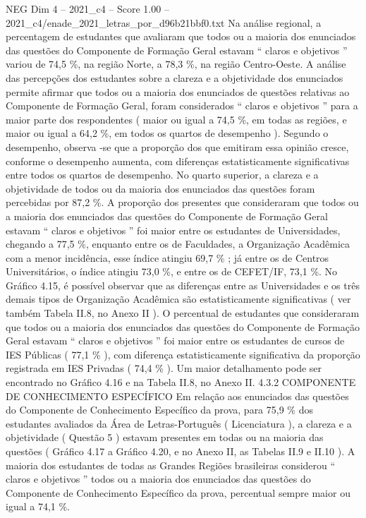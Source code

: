 \begin{textsample}{NEG Dim 4 – 2021\_c4 – Score 1.00 – 2021\_c4/enade\_2021\_letras\_por\_d96b21bbf0.txt}
Na análise regional, a percentagem de estudantes que avaliaram que todos ou a maioria dos enunciados das questões do Componente de Formação Geral estavam “ claros e objetivos ” variou de 74,5 \%, na região Norte, a 78,3 \%, na região Centro-Oeste.
A análise das percepções dos estudantes sobre a clareza e a objetividade dos enunciados permite afirmar que todos ou a maioria dos enunciados de questões relativas ao Componente de Formação Geral, foram considerados “ claros e objetivos ” para a maior parte dos respondentes ( maior ou igual a 74,5 \%, em todas as regiões, e maior ou igual a 64,2 \%, em todos os quartos de desempenho ).
Segundo o desempenho, observa -se que a proporção dos que emitiram essa opinião cresce, conforme o desempenho aumenta, com diferenças estatisticamente significativas entre todos os quartos de desempenho.
No quarto superior, a clareza e a objetividade de todos ou da maioria dos enunciados das questões foram percebidas por 87,2 \%.
A proporção dos presentes que consideraram que todos ou a maioria dos enunciados das questões do Componente de Formação Geral estavam “ claros e objetivos ” foi maior entre os estudantes de Universidades, chegando a 77,5 \%, enquanto entre os de Faculdades, a Organização Acadêmica com a menor incidência, esse índice atingiu 69,7 \% ; já entre os de Centros Universitários, o índice atingiu 73,0 \%, e entre os de CEFET/IF, 73,1 \%.
No Gráfico 4.15, é possível observar que as diferenças entre as Universidades e os três demais tipos de Organização Acadêmica são estatisticamente significativas ( ver também Tabela II.8, no Anexo II ).
O percentual de estudantes que consideraram que todos ou a maioria dos enunciados das questões do Componente de Formação Geral estavam “ claros e objetivos ” foi maior entre os estudantes de cursos de IES Públicas ( 77,1 \% ), com diferença estatisticamente significativa da proporção registrada em IES Privadas ( 74,4 \% ).
Um maior detalhamento pode ser encontrado no Gráfico 4.16 e na Tabela II.8, no Anexo II. 4.3.2 COMPONENTE DE CONHECIMENTO ESPECÍFICO Em relação aos enunciados das questões do Componente de Conhecimento Específico da prova, para 75,9 \% dos estudantes avaliados da Área de Letras-Português ( Licenciatura ), a clareza e a objetividade ( Questão 5 ) estavam presentes em todas ou na maioria das questões ( Gráfico 4.17 a Gráfico 4.20, e no Anexo II, as Tabelas II.9 e II.10 ).
A maioria dos estudantes de todas as Grandes Regiões brasileiras considerou “ claros e objetivos ” todos ou a maioria dos enunciados das questões do Componente de Conhecimento Específico da prova, percentual sempre maior ou igual a 74,1 \%.

\end{textsample}
